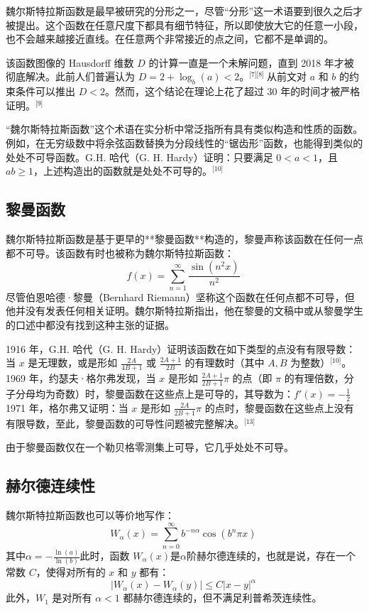 魏尔斯特拉斯函数是最早被研究的分形之一，尽管“分形”这一术语要到很久之后才被提出。这个函数在任意尺度下都具有细节特征，所以即使放大它的任意一小段，也不会越来越接近直线。在任意两个非常接近的点之间，它都不是单调的。

该函数图像的 Hausdorff 维数 $D$ 的计算一直是一个未解问题，直到 2018 年才被彻底解决。此前人们普遍认为 $D = 2 + \log_b(a) < 2$。\(^\text{[7][8] }\)从前文对 $a$ 和 $b$ 的约束条件可以推出 $D < 2$。然而，这个结论在理论上花了超过 30 年的时间才被严格证明。\(^\text{[9]}\)

“魏尔斯特拉斯函数”这个术语在实分析中常泛指所有具有类似构造和性质的函数。例如，在无穷级数中将余弦函数替换为分段线性的“锯齿形”函数，也能得到类似的处处不可导函数。G.H. 哈代（G. H. Hardy）证明：只要满足 $0 < a < 1$，且 $ab \geq 1$，上述构造出的函数就是处处不可导的。\(^\text{[10]}\)
\subsection{黎曼函数}
魏尔斯特拉斯函数是基于更早的**黎曼函数**构造的，黎曼声称该函数在任何一点都不可导。该函数有时也被称为魏尔斯特拉斯函数：
$$
f(x) = \sum_{n=1}^{\infty} \frac{\sin(n^2 x)}{n^2}~
$$
尽管伯恩哈德·黎曼（Bernhard Riemann）坚称这个函数在任何点都不可导，但他并没有发表任何相关证明。魏尔斯特拉斯指出，他在黎曼的文稿中或从黎曼学生的口述中都没有找到这种主张的证据。

1916 年，G.H. 哈代（G. H. Hardy）证明该函数在如下类型的点没有有限导数：当 $x$ 是无理数，或是形如 $\frac{2A}{4B+1}$ 或 $\frac{2A+1}{2B}$ 的有理数时（其中 $A, B$ 为整数）\(^\text{[10]}\)。1969 年，约瑟夫·格尔弗发现，当 $x$ 是形如 $\frac{2A+1}{2B+1}\pi$ 的点（即 $\pi$ 的有理倍数，分子分母均为奇数）时，黎曼函数在这些点上是可导的，其导数为：$f'(x) = -\frac{1}{2}$1971 年，格尔弗又证明：当 $x$ 是形如 $\frac{2A}{2B+1}\pi$ 的点时，黎曼函数在这些点上没有有限导数，至此，黎曼函数的可导性问题被完整解决。\(^\text{[13]}\)

由于黎曼函数仅在一个勒贝格零测集上可导，它几乎处处不可导。
\subsection{赫尔德连续性}
魏尔斯特拉斯函数也可以等价地写作：
$$
W_\alpha(x) = \sum_{n=0}^{\infty} b^{-n\alpha} \cos(b^n \pi x)~
$$
其中$\alpha = -\frac{\ln(a)}{\ln(b)}$此时，函数 $W_\alpha(x)$是$\alpha$阶赫尔德连续的，也就是说，存在一个常数 $C$，使得对所有的 $x$ 和 $y$ 都有：
$$
|W_\alpha(x) - W_\alpha(y)| \leq C |x - y|^\alpha~
$$
此外，$W_1$ 是对所有 $\alpha < 1$ 都赫尔德连续的，但不满足利普希茨连续性。
